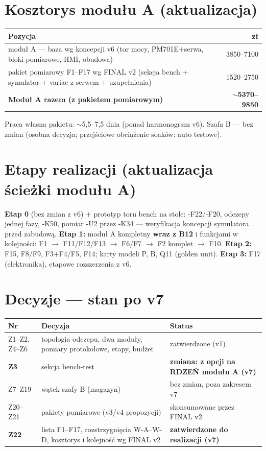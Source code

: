\documentclass[11pt,a4paper]{article}
\begin{document}
\section{Kosztorys modułu A (aktualizacja)}
\begin{longtable}{@{}p{}r@{}}
\toprule
\textbf{Pozycja} & \textbf{zł}\\
\midrule
moduł A --- baza wg koncepcji v6 (tor mocy, PM701E$+$serwa, bloki pomiarowe, HMI, obudowa) &
3850--7100\\
pakiet pomiarowy F1--F17 wg FINAL v2 (sekcja bench $+$ symulator $+$ variac z serwem $+$
uzupełnienia) & 1520--2750\\
\midrule
\textbf{Moduł A razem (z pakietem pomiarowym)} & \textbf{$\sim$5370--9850}\\
\bottomrule
\end{longtable}
Praca własna pakietu: $\sim$5,5--7,5 dnia (ponad harmonogram v6). Szafa B --- bez zmian (osobna
decyzja; przejściowe obciążenie soaków: auto testowe).

\section{Etapy realizacji (aktualizacja ścieżki modułu A)}
\textbf{Etap 0} (bez zmian z v6) $+$ prototyp toru bench na stole: -F22/-F20, odczepy jednej fazy,
-K50, pomiar -U2 przez -K34 --- weryfikacja koncepcji symulatora przed zabudową.
\textbf{Etap 1:} moduł A kompletny \textbf{wraz z B12} i funkcjami w kolejności:
F1 $\to$ F11/F12/F13 $\to$ F6/F7 $\to$ F2 komplet $\to$ F10.
\textbf{Etap 2:} F15, F8/F9, F3$+$F4/F5, F14; karty modeli P, B, Q11 (golden unit).
\textbf{Etap 3:} F17 (elektronika), etapowe rozszerzenia z v6.

\section{Decyzje --- stan po v7}
\begin{longtable}{@{}p{}p{}p{}@{}}
\toprule
\textbf{Nr} & \textbf{Decyzja} & \textbf{Status}\\
\midrule
Z1--Z2, Z4--Z6 & topologia odczepu, dwa moduły, pomiary protokołowe, etapy, budżet & zatwierdzone (v1)\\
\textbf{Z3} & sekcja bench-test & \textbf{zmiana: z opcji na RDZEŃ modułu A (v7)}\\
Z7--Z19 & wątek szafy B (magazyn) & bez zmian, poza zakresem v7\\
Z20--Z21 & pakiety pomiarowe (v3/v4 propozycji) & skonsumowane przez FINAL v2\\
\textbf{Z22} & lista F1--F17, rozstrzygnięcia W-A--W-D, kosztorys i kolejność wg FINAL v2 &
\textbf{zatwierdzone do realizacji (v7)}\\
\bottomrule
\end{longtable}
\end{document}
